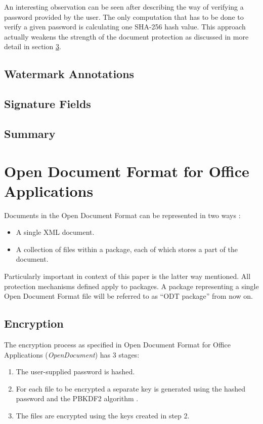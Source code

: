\documentclass[11pt,oneside]{fithesis2}
\begin{document}
An interesting observation can be seen after describing the way of verifying a password provided by the user. The only computation that has to be done to verify a given password is calculating one SHA-256 hash value. This approach actually weakens the strength of the document protection as discussed in more detail in section \ref{pdf_summ}.

\section{Watermark Annotations}

\section{Signature Fields}

\section{Summary}\label{pdf_summ}

\chapter{Open Document Format for Office Applications}

Documents in the Open Document Format can be represented in two ways \cite{odt_spec}:

\begin{itemize}
\setlength\itemsep{0.1em}
\item{A single XML document.}
\item{A collection of files within a package, each of which stores a part of the document.}
\end{itemize}

Particularly important in context of this paper is the latter way mentioned. All protection mechanisms defined apply to packages. A package representing a single Open Document Format file will be referred to as “ODT package” from now on.

\section{Encryption}\label{odt_enc}

The encryption process as specified in Open Document Format for Office Applications (\textit{OpenDocument}) \cite{odt_spec} has 3 stages:

\begin{enumerate}
\setlength\itemsep{0.1em}
	\item{The user-supplied password is hashed.}
	\item{For each file to be encrypted a separate key is generated using the hashed password and the PBKDF2 algorithm \cite{rfc2898}.}
	\item{The files are encrypted using the keys created in step 2.}
\end{enumerate}
\end{document}
